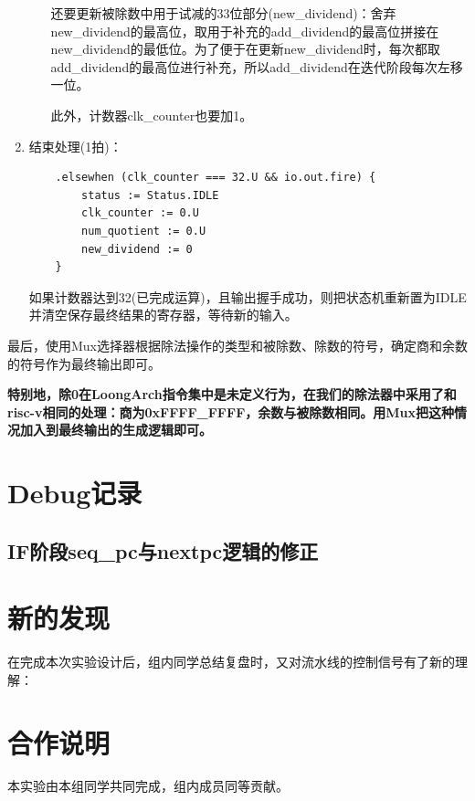 \documentclass[11pt]{article}
\begin{document}
\begin{enumerate}
\begin{enumerate}
        还要更新被除数中用于试减的33位部分(new_dividend)：舍弃new_dividend的最高位，取用于补充的add_dividend的最高位拼接在new_dividend的最低位。为了便于在更新new_dividend时，每次都取add_dividend的最高位进行补充，所以add_dividend在迭代阶段每次左移一位。

        此外，计数器clk_counter也要加1。
    \end{enumerate}
    
    \item 结束处理(1拍)：
    \begin{lstlisting}
    .elsewhen (clk_counter === 32.U && io.out.fire) {
        status := Status.IDLE
        clk_counter := 0.U
        num_quotient := 0.U
        new_dividend := 0
    }
    \end{lstlisting}
    如果计数器达到32(已完成运算)，且输出握手成功，则把状态机重新置为IDLE并清空保存最终结果的寄存器，等待新的输入。

\end{enumerate}

最后，使用Mux选择器根据除法操作的类型和被除数、除数的符号，确定商和余数的符号作为最终输出即可。

\textbf{特别地，除0在LoongArch指令集中是未定义行为，在我们的除法器中采用了和risc-v相同的处理：商为0xFFFF_FFFF，余数与被除数相同。用Mux把这种情况加入到最终输出的生成逻辑即可。}


\section{Debug记录}

\subsection{IF阶段seq_pc与nextpc逻辑的修正}



\section{新的发现}
在完成本次实验设计后，组内同学总结复盘时，又对流水线的控制信号有了新的理解：




\section{合作说明}

本实验由本组同学共同完成，组内成员同等贡献。
\end{document}
